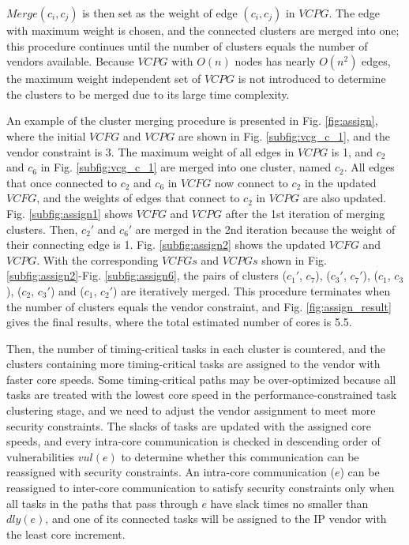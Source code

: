 \documentclass[10pt,journal, compsoc]{IEEEtran}
\begin{document}
$Merge(c_i, c_j)$ is then set as the weight of edge $(c_i, c_j)$ in $VCPG$. The edge with maximum weight is chosen, and the connected clusters are merged into one; this procedure continues until the number of clusters equals the number of vendors available. Because $VCPG$ with $O(n)$ nodes has nearly $O(n^2)$ edges, the maximum weight independent set of $VCPG$ is not introduced to determine the clusters to be merged due to its large time complexity.



An example of the cluster merging procedure is presented in Fig. \ref{fig:assign}, where the initial $VCFG$ and $VCPG$ are shown in Fig. \ref{subfig:vcg_c_1}, and the vendor constraint is 3. The maximum weight of all edges in $VCPG$ is 1, and $c_2$ and $c_6$ in Fig. \ref{subfig:vcg_c_1} are merged into one cluster, named $c_2$. All edges that once connected to $c_2$ and $c_6$ in $VCFG$ now connect to $c_2$ in the updated $VCFG$, and the weights of edges that connect to $c_2$ in $VCPG$ are also updated. Fig. \ref{subfig:assign1} shows $VCFG$ and $VCPG$ after the 1st iteration of merging clusters. Then, $c_2'$ and $c_6'$ are merged in the 2nd iteration because the weight of their connecting edge is 1. Fig. \ref{subfig:assign2} shows the updated $VCFG$ and $VCPG$. With the corresponding $VCFGs$ and $VCPGs$ shown in Fig. \ref{subfig:assign2}-Fig. \ref{subfig:assign6}, the pairs of clusters ($c_1'$, $c_7$), ($c_3'$, $c_7'$), ($c_1$, $c_3$), ($c_2$, $c_3'$) and ($c_1$, $c_2'$) are iteratively merged. This procedure terminates when the number of clusters equals the vendor constraint, and Fig. \ref{fig:assign_result} gives the final results, where the total estimated number of cores is 5.5.



Then, the number of timing-critical tasks in each cluster is countered, and the clusters containing more timing-critical tasks are assigned to the vendor with faster core speeds. Some timing-critical paths may be over-optimized because all tasks are treated with the lowest core speed in the performance-constrained task clustering stage, and we need to adjust the vendor assignment to meet more security constraints. The slacks of tasks are updated with the assigned core speeds, and every intra-core communication is checked in descending order of vulnerabilities $vul(e)$ to determine whether this communication can be reassigned with security constraints. An intra-core communication ($e$) can be reassigned to inter-core communication to satisfy security constraints only when all tasks in the paths that pass through $e$ have slack times no smaller than $dly(e)$, and one of its connected tasks will be assigned to the IP vendor with the least core increment.%
\end{document}
